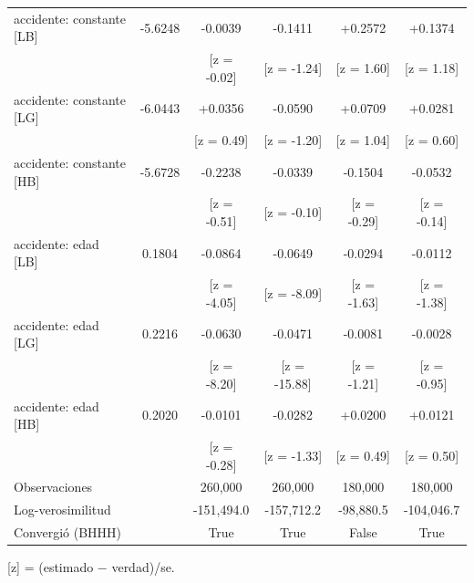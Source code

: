 \begin{table}[htbp]
\begin{tabular}{lccccc}
accidente: constante [LB] & -5.6248 & -0.0039 & -0.1411 & +0.2572 & +0.1374 \\
 &  & [z = -0.02] & [z = -1.24] & [z = 1.60] & [z = 1.18] \\
accidente: constante [LG] & -6.0443 & +0.0356 & -0.0590 & +0.0709 & +0.0281 \\
 &  & [z = 0.49] & [z = -1.20] & [z = 1.04] & [z = 0.60] \\
accidente: constante [HB] & -5.6728 & -0.2238 & -0.0339 & -0.1504 & -0.0532 \\
 &  & [z = -0.51] & [z = -0.10] & [z = -0.29] & [z = -0.14] \\
accidente: edad [LB] & 0.1804 & -0.0864 & -0.0649 & -0.0294 & -0.0112 \\
 &  & [z = -4.05] & [z = -8.09] & [z = -1.63] & [z = -1.38] \\
accidente: edad [LG] & 0.2216 & -0.0630 & -0.0471 & -0.0081 & -0.0028 \\
 &  & [z = -8.20] & [z = -15.88] & [z = -1.21] & [z = -0.95] \\
accidente: edad [HB] & 0.2020 & -0.0101 & -0.0282 & +0.0200 & +0.0121 \\
 &  & [z = -0.28] & [z = -1.33] & [z = 0.49] & [z = 0.50] \\
Observaciones &  & 260,000 & 260,000 & 180,000 & 180,000 \\
Log-verosimilitud &  & -151,494.0 & -157,712.2 & -98,880.5 & -104,046.7 \\
Convergió (BHHH) &  & True & True & False & True \\
\bottomrule
\end{tabular}
\par\smallskip\footnotesize [z] = (estimado $-$ verdad)/se.
\end{table}
